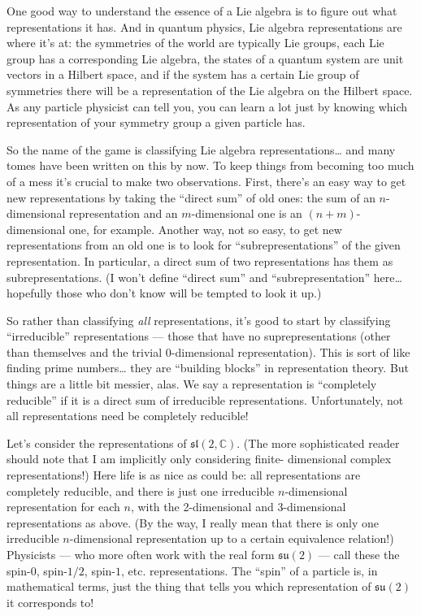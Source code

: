 \documentclass{article}
\begin{document}
One good way to understand the essence of a Lie algebra is to figure out
what representations it has. And in quantum physics, Lie algebra
representations are where it's at: the symmetries of the world are
typically Lie groups, each Lie group has a corresponding Lie algebra,
the states of a quantum system are unit vectors in a Hilbert space, and
if the system has a certain Lie group of symmetries there will be a
representation of the Lie algebra on the Hilbert space. As any particle
physicist can tell you, you can learn a lot just by knowing which
representation of your symmetry group a given particle has.

So the name of the game is classifying Lie algebra
representations\ldots{} and many tomes have been written on this by now.
To keep things from becoming too much of a mess it's crucial to make two
observations. First, there's an easy way to get new representations by
taking the ``direct sum'' of old ones: the sum of an \(n\)-dimensional
representation and an \(m\)-dimensional one is an \((n+m)\)-dimensional
one, for example. Another way, not so easy, to get new representations
from an old one is to look for ``subrepresentations'' of the given
representation. In particular, a direct sum of two representations has
them as subrepresentations. (I won't define ``direct sum'' and
``subrepresentation'' here\ldots{} hopefully those who don't know will
be tempted to look it up.)

So rather than classifying \emph{all} representations, it's good to
start by classifying ``irreducible'' representations --- those that have
no suprepresentations (other than themselves and the trivial
0-dimensional representation). This is sort of like finding prime
numbers\ldots{} they are ``building blocks'' in representation theory.
But things are a little bit messier, alas. We say a representation is
``completely reducible'' if it is a direct sum of irreducible
representations. Unfortunately, not all representations need be
completely reducible!

Let's consider the representations of \(\mathfrak{sl}(2,\mathbb{C})\).
(The more sophisticated reader should note that I am implicitly only
considering finite- dimensional complex representations!) Here life is
as nice as could be: all representations are completely reducible, and
there is just one irreducible \(n\)-dimensional representation for each
\(n\), with the 2-dimensional and 3-dimensional representations as
above. (By the way, I really mean that there is only one irreducible
\(n\)-dimensional representation up to a certain equivalence relation!)
Physicists --- who more often work with the real form
\(\mathfrak{su}(2)\) --- call these the spin-\(0\), spin-\(1/2\),
spin-\(1\), etc. representations. The ``spin'' of a particle is, in
mathematical terms, just the thing that tells you which representation
of \(\mathfrak{su}(2)\) it corresponds to!
\end{document}
